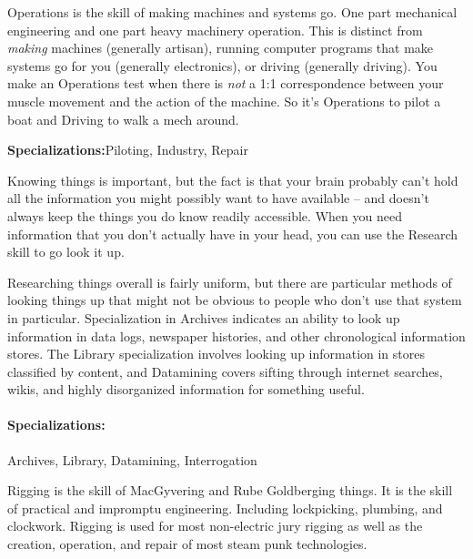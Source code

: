 
\hspace{\parindent} Operations is the skill of making machines and systems go. One part mechanical engineering and one part heavy machinery operation. This is distinct from \textit{making} machines (generally artisan), running computer programs that make systems go for you (generally electronics), or driving (generally driving). You make an Operations test when there is \textit{not} a 1:1 correspondence between your muscle movement and the action of the machine. So it's Operations to pilot a boat and Driving to walk a mech around.

\textbf{Specializations:}Piloting, Industry, Repair


\hspace{\parindent} Knowing things is important, but the fact is that your brain probably can't hold all the information you might possibly want to have available -- and doesn't always keep the things you do know readily accessible. When you need information that you don't actually have in your head, you can use the Research skill to go look it up. 

Researching things overall is fairly uniform, but there are particular methods of looking things up that might not be obvious to people who don't use that system in particular. Specialization in Archives indicates an ability to look up information in data logs, newspaper histories, and other chronological information stores. The Library specialization involves looking up information in stores classified by content, and Datamining covers sifting through internet searches, wikis, and highly disorganized information for something useful. 

\paragraph{Specializations:} Archives, Library, Datamining, Interrogation


\hspace{\parindent} Rigging is the skill of MacGyvering and Rube Goldberging things. It is the skill of practical and impromptu engineering. Including lockpicking, plumbing, and clockwork. Rigging is used for most non-electric jury rigging as well as the creation, operation, and repair of most steam punk technologies. 

